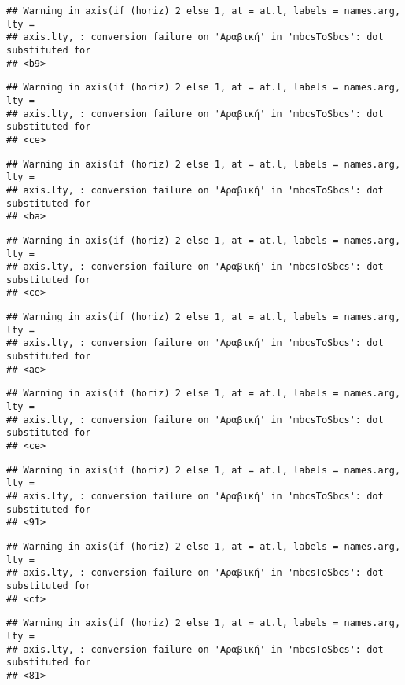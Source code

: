 \documentclass[
]{article}
\begin{document}
\begin{verbatim}
## Warning in axis(if (horiz) 2 else 1, at = at.l, labels = names.arg, lty =
## axis.lty, : conversion failure on 'Αραβική' in 'mbcsToSbcs': dot substituted for
## <b9>
\end{verbatim}

\begin{verbatim}
## Warning in axis(if (horiz) 2 else 1, at = at.l, labels = names.arg, lty =
## axis.lty, : conversion failure on 'Αραβική' in 'mbcsToSbcs': dot substituted for
## <ce>
\end{verbatim}

\begin{verbatim}
## Warning in axis(if (horiz) 2 else 1, at = at.l, labels = names.arg, lty =
## axis.lty, : conversion failure on 'Αραβική' in 'mbcsToSbcs': dot substituted for
## <ba>
\end{verbatim}

\begin{verbatim}
## Warning in axis(if (horiz) 2 else 1, at = at.l, labels = names.arg, lty =
## axis.lty, : conversion failure on 'Αραβική' in 'mbcsToSbcs': dot substituted for
## <ce>
\end{verbatim}

\begin{verbatim}
## Warning in axis(if (horiz) 2 else 1, at = at.l, labels = names.arg, lty =
## axis.lty, : conversion failure on 'Αραβική' in 'mbcsToSbcs': dot substituted for
## <ae>
\end{verbatim}

\begin{verbatim}
## Warning in axis(if (horiz) 2 else 1, at = at.l, labels = names.arg, lty =
## axis.lty, : conversion failure on 'Αραβική' in 'mbcsToSbcs': dot substituted for
## <ce>
\end{verbatim}

\begin{verbatim}
## Warning in axis(if (horiz) 2 else 1, at = at.l, labels = names.arg, lty =
## axis.lty, : conversion failure on 'Αραβική' in 'mbcsToSbcs': dot substituted for
## <91>
\end{verbatim}

\begin{verbatim}
## Warning in axis(if (horiz) 2 else 1, at = at.l, labels = names.arg, lty =
## axis.lty, : conversion failure on 'Αραβική' in 'mbcsToSbcs': dot substituted for
## <cf>
\end{verbatim}

\begin{verbatim}
## Warning in axis(if (horiz) 2 else 1, at = at.l, labels = names.arg, lty =
## axis.lty, : conversion failure on 'Αραβική' in 'mbcsToSbcs': dot substituted for
## <81>
\end{verbatim}
\end{document}
